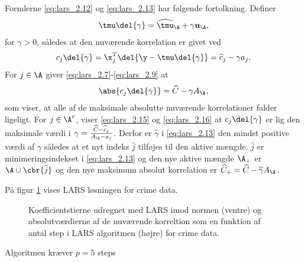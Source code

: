 %
Formlerne \eqref{eq:lars_2.12} og \eqref{eq:lars_2.13} har følgende fortolkning.
Definer
\begin{align}
\tmu \del{\gamma} = \widehat{\tmu}_\A + \gamma \mathbf{u}_\A, \label{eq:lars_2.14}
\end{align}
for \(\gamma > 0\), således at den nuværende korrelation er givet ved
\begin{align}
c_j \del{\gamma} = \x_j^T \del{\y - \tmu \del{\gamma}} = \widehat{c}_j - \gamma a_j. \label{eq:lars_2.15}
\end{align}
For \(j \in \A\) giver \eqref{eq:lars_2.7}-\eqref{eq:lars_2.9} at
\begin{align}
\abs{c_j \del{\gamma}} = \widehat{C} - \gamma A_\A,\label{eq:lars_2.16}
\end{align}
som viser, at alle af de maksimale absolutte nuværende korrelationer falder ligeligt.
For \(j \in \A^c\), viser \eqref{eq:lars_2.15} og \eqref{eq:lars_2.16} at \(c_j \del{\gamma}\) er lig den maksimale værdi i \(\gamma = \frac{\widehat{C} - \widehat{c}_j}{A_\A - a_j}\).
Derfor er \(\hat{\gamma}\) i \eqref{eq:lars_2.13} den mindst positive værdi af \(\gamma\) således at et nyt indeks \(\widehat{j}\) tilføjes til den aktive mængde.
\(\hat{j}\) er minimeringsindekset i \eqref{eq:lars_2.13} og den nye aktive mængde \(\A_+\) er \(\A \cup \cbr{\widehat{j}}\) og den nye maksimum absolut korrelation er \(\widehat{C}_+ = \widehat{C}- \widehat{\gamma} A_\A\).

På figur \ref{fig:crime_lar} vises LARS løsningen for crime data.
\begin{figure}[H]
\centering
{}
\caption{Koefficientstierne udregnet med LARS imod normen (ventre) og absolutværdierne af de nuværende korreltion som en funktion af antal step i LARS algoritmen (højre) for crime data.} \label{fig:crime_lar}
\end{figure}
Algoritmen kræver \(p=5\) steps 

